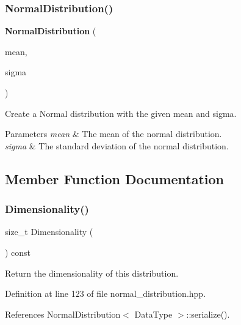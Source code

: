 \subsubsection{Normal\+Distribution()\hspace{0.1cm}{\footnotesize\ttfamily [2/2]}}
{\footnotesize\ttfamily \textbf{ Normal\+Distribution} (\begin{DoxyParamCaption}\item[{const Data\+Type \&}]{mean,  }\item[{const Data\+Type \&}]{sigma }\end{DoxyParamCaption})}



Create a Normal distribution with the given mean and sigma. 


\begin{DoxyParams}{Parameters}
{\em mean} & The mean of the normal distribution. \\
\hline
{\em sigma} & The standard deviation of the normal distribution. \\
\hline
\end{DoxyParams}


\subsection{Member Function Documentation}
\mbox{\label{classmlpack_1_1ann_1_1NormalDistribution_a78eda6bfb9e9462afa0fc85e32abe1af}} 
\subsubsection{Dimensionality()}
{\footnotesize\ttfamily size\+\_\+t Dimensionality (\begin{DoxyParamCaption}{ }\end{DoxyParamCaption}) const\hspace{0.3cm}{\ttfamily [inline]}}



Return the dimensionality of this distribution. 



Definition at line 123 of file normal\+\_\+distribution.\+hpp.



References Normal\+Distribution$<$ Data\+Type $>$\+::serialize().

